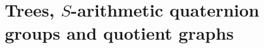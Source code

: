 \section{Trees, $S$-arithmetic quaternion groups and quotient graphs}\label{sec:stage-02}
\providecommand{\BG}{\mathrm{BG}}          %
\providecommand{\Xone}{X^1_B}              %
\providecommand{\HypSA}{\mathrm{Hyp.SA}}   %
\providecommand{\HypHS}{\mathrm{Hyp.HS}}   %

